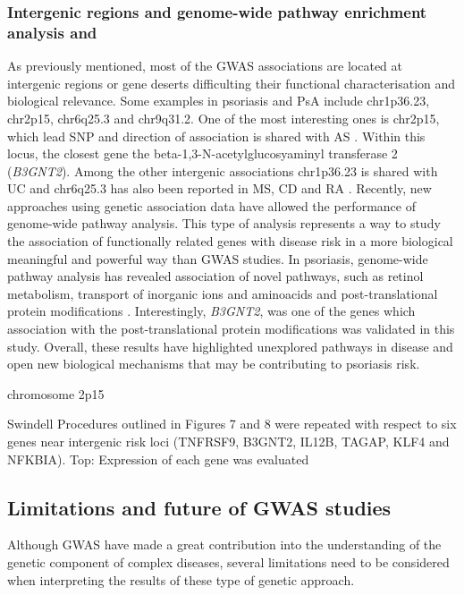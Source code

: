 
\subsubsection{Intergenic regions and genome-wide pathway enrichment analysis and }
As previously mentioned, most of the GWAS associations are located at intergenic regions or gene deserts difficulting their functional characterisation and biological relevance. Some examples in psoriasis and PsA include chr1p36.23, chr2p15, chr6q25.3 and chr9q31.2. One of the most interesting ones is chr2p15, which lead SNP and direction of association is shared with AS \parencite{Immunobase}. Within this locus, the closest gene the beta-1,3-N-acetylglucosyaminyl transferase 2 (\textit{B3GNT2}). Among the other intergenic associations chr1p36.23 is shared with UC and chr6q25.3 has also been reported in MS, CD and RA \parencite{Immunobase}. 
Recently, new approaches using genetic association data have allowed the performance of genome-wide pathway analysis. This type of analysis represents a way to study the association of functionally related genes with disease risk in a more biological meaningful and powerful way than GWAS studies. In psoriasis, genome-wide pathway analysis has revealed association of novel pathways, such as retinol metabolism, transport of inorganic ions and aminoacids and post-translational protein modifications \parencite{Aterido2015}. Interestingly, \textit{B3GNT2}, was one of the genes which association with the post-translational protein modifications was validated in this study. Overall, these results have highlighted unexplored pathways in disease and open new biological mechanisms that may be contributing to psoriasis risk. 
  

chromosome 2p15

Swindell
Procedures outlined in Figures 7 and 8 were repeated with respect to six genes near intergenic risk loci (TNFRSF9, B3GNT2, IL12B, TAGAP, KLF4 and NFKBIA). Top: Expression of each gene was evaluated 


\subsection{Limitations and future of GWAS studies}
Although GWAS have made a great contribution into the understanding of the genetic component of complex diseases, several limitations need to be considered when interpreting the results of these type of genetic approach. 

